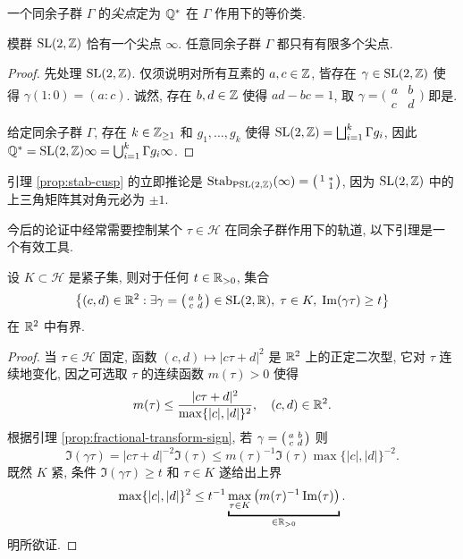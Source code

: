 \begin{definition}\label{def:cusp-congruence-subgroup} 
	一个同余子群 $\Gamma$ 的\emph{尖点}定为 $\mathbb{Q}^*$ 在 $\Gamma$ 作用下的等价类.
\end{definition}

\begin{proposition}\label{prop:cusp-finiteness}
	模群 $\operatorname{SL}(2,\mathbb{Z})$ 恰有一个尖点 $\infty$. 任意同余子群 $\Gamma$ 都只有有限多个尖点.
\end{proposition}
\begin{proof}
	先处理 $\operatorname{SL}(2,\mathbb{Z})$. 仅须说明对所有互素的 $a,c \in \mathbb{Z}$, 皆存在 $\gamma \in \operatorname{SL}(2,\mathbb{Z})$ 使得 $\gamma(1:0) = (a:c)$. 诚然, 存在 $b,d \in \mathbb{Z}$ 使得 $ad - bc = 1$, 取 $\gamma = \bigl(\begin{smallmatrix} a & b \\ c & d \end{smallmatrix} \bigr)$ 即是.

	给定同余子群 $\Gamma$, 存在 $k \in \mathbb{Z}_{\geq 1}$ 和 $g_1, \ldots, g_k$ 使得 $\operatorname{SL}(2,\mathbb{Z}) = \bigsqcup_{i=1}^k \Gamma g_i$, 因此 $\mathbb{Q}^* = \operatorname{SL}(2,\mathbb{Z})\infty = \bigcup_{i=1}^k \Gamma g_i \infty$.
\end{proof}

引理 \ref{prop:stab-cusp} 的立即推论是 $\operatorname{Stab}_{\operatorname{PSL}(2,\mathbb{Z})}(\infty) = \bigl(\begin{smallmatrix} 1 & * \\  & 1 \end{smallmatrix}\bigr)$, 因为 $\operatorname{SL}(2,\mathbb{Z})$ 中的上三角矩阵其对角元必为 $\pm 1$.

今后的论证中经常需要控制某个 $\tau \in \mathcal{H}$ 在同余子群作用下的轨道, 以下引理是一个有效工具.
\begin{lemma}\label{prop:finiteness-aux}
	设 $K \subset \mathcal{H}$ 是紧子集, 则对于任何 $t \in \mathbb{R}_{>0}$, 集合
	\[ \left\{ (c,d) \in \mathbb{R}^2 : \exists \gamma = \bigl(\begin{smallmatrix} a & b \\ c & d \end{smallmatrix}\bigr) \in \operatorname{SL}(2, \mathbb{R}), \; \tau \in K, \; \operatorname{Im}(\gamma\tau) \geq t \right\} \]
	在 $\mathbb{R}^2$ 中有界.
\end{lemma}
\begin{proof}
	当 $\tau \in \mathcal{H}$ 固定, 函数 $(c,d) \mapsto |c\tau+d|^2$ 是 $\mathbb{R}^2$ 上的正定二次型, 它对 $\tau$ 连续地变化, 因之可选取 $\tau$ 的连续函数 $m(\tau) > 0$ 使得
	\[ m(\tau) \leq \dfrac{ |c\tau + d|^2 }{ \max\{ |c|, |d| \}^2 }, \quad (c,d) \in \mathbb{R}^2. \]
	根据引理 \ref{prop:fractional-transform-sign}, 若 $\gamma = \bigl(\begin{smallmatrix} a & b \\ c & d \end{smallmatrix}\bigr)$ 则
	\[ \Im(\gamma \tau) = |c\tau+d|^{-2} \Im(\tau) \leq m(\tau)^{-1} \Im(\tau) \max\{ |c|, |d| \}^{-2}. \]
	既然 $K$ 紧, 条件 $\Im(\gamma\tau) \geq t$ 和 $\tau \in K$ 遂给出上界
	\[ \max\{|c|, |d|\}^2 \leq t^{-1} \underbracket{\max_{\tau \in K} \left( m(\tau)^{-1} \Im(\tau) \right)}_{\in \R_{>0}}. \]
	明所欲证.
\end{proof}


